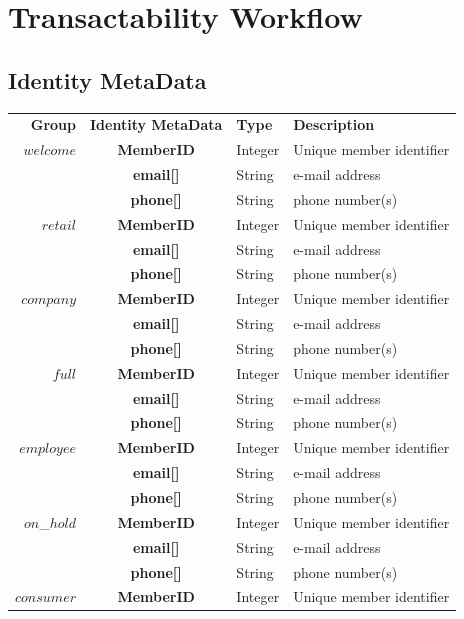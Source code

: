 \section{Transactability Workflow}

\subsection{Identity MetaData}

\begin{table}[H]
\begin{centering}
\small
{
\begin{tabular}{ r | c | l | l }
\textbf{Group}	& {\bf Identity MetaData} & {\bf Type} & {\bf Description} \\
\Xhline{1.5pt}
$welcome$	& {\bf MemberID}			&Integer	& Unique member identifier \\
			& {\bf email[]}				&String	& e-mail address \\		
			& {\bf phone[]}				&String	& phone number(s) \\
\hline
$retail$		& {\bf MemberID}			&Integer	& Unique member identifier \\
			& {\bf email[]}				&String	& e-mail address \\
			& {\bf phone[]}				&String	& phone number(s) \\
\hline
$company$	& {\bf MemberID}			&Integer	& Unique member identifier \\
			& {\bf email[]}				&String	& e-mail address \\
			& {\bf phone[]}				&String	& phone number(s) \\
\hline
$full$		& {\bf MemberID}			&Integer	& Unique member identifier \\
			& {\bf email[]}				&String	& e-mail address \\
			& {\bf phone[]}				&String	& phone number(s) \\
\hline
$employee$	& {\bf MemberID}			&Integer	& Unique member identifier \\
			& {\bf email[]}				&String	& e-mail address \\
			& {\bf phone[]}				&String	& phone number(s) \\
\hline
$on$\_$hold$	& {\bf MemberID}			&Integer	& Unique member identifier \\
			& {\bf email[]}				&String	& e-mail address \\
			& {\bf phone[]}				&String	& phone number(s) \\
\hline
$consumer$	& {\bf MemberID}	&Integer & Unique member identifier \\

\end{tabular}}
\end{centering}
\end{table}
